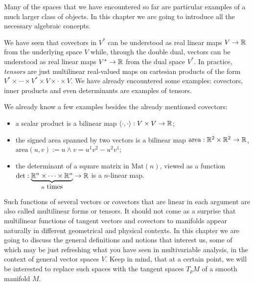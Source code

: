 Many of the spaces that we have encountered so far are particular examples of a much larger class of objects.
In this chapter we are going to introduce all the necessary algebraic concepts.

We have seen that covectors in $V^*$ can be understood as real linear maps $V\to\mathbb{R}$ from the underlying space $V$ while, through the double dual, vectors can be understood as real linear maps $V^*\to\mathbb{R}$ from the dual space $V^*$.
In practice, \emph{tensors} are just multilinear real-valued maps on cartesian products of the form $V^*\times \cdots \times V^* \times V \times \cdot \times V$.
We have already encountered some examples: covectors, inner products and even determinants are examples of tensors.

We already know a few examples besides the already mentioned covectors:
\begin{itemize}
  \item a scalar product is a bilinear map $\langle\cdot,\cdot\rangle:V\times V\to \mathbb{R}$;
  \item the signed area spanned by two vectors is a bilinear map $\mathrm{area}: \mathbb{R}^2\times\mathbb{R}^2\to\mathbb{R}$, $\mathrm{area}(u,v) := u\wedge v = u^1v^2-u^2v^1$;
  \item the determinant of a square matrix in $\mathrm{Mat}(n)$, viewed as a function $\det: \LaTeXunderbrace{\R^n\times\cdots\times\R^n}_{n\mbox{ times}}\to\R$ is a $n$-linear map.
\end{itemize}

Such functions of several vectors or covectors that are linear in each argument are also called multilinear forms or tensors.
It should not come as a surprise that multilinear functions of tangent vectors and covectors to manifolds appear naturally in different geometrical and physical contexts.
In this chapter we are going to discuss the general definitions and notions that interest us, some of which may be just refreshing what you have seen in multivariable analysis, in the context of general vector spaces $V$.
Keep in mind, that at a certain point, we will be interested to replace such spaces with the tangent spaces $T_pM$ of a smooth manifold $M$.

